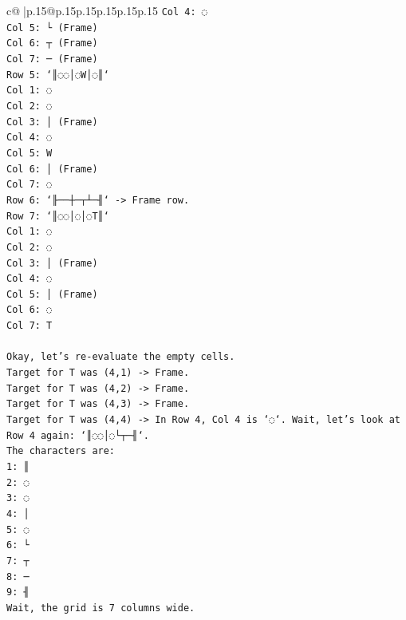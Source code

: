 \documentclass{article}
\begin{document}
{\begin{supertabular}{c@{$\;$}|p{.15\linewidth}@{}p{.15\linewidth}p{.15\linewidth}p{.15\linewidth}p{.15\linewidth}p{.15\linewidth}}
{{{\texttt{Col 4: ◌} \\
\texttt{Col 5: └ (Frame)} \\
\texttt{Col 6: ┬ (Frame)} \\
\texttt{Col 7: ─ (Frame)} \\
\texttt{Row 5: `║◌◌│◌W│◌║`} \\
\texttt{Col 1: ◌} \\
\texttt{Col 2: ◌} \\
\texttt{Col 3: │ (Frame)} \\
\texttt{Col 4: ◌} \\
\texttt{Col 5: W} \\
\texttt{Col 6: │ (Frame)} \\
\texttt{Col 7: ◌} \\
\texttt{Row 6: `╟──┼─┬┴─╢` {-}> Frame row.} \\
\texttt{Row 7: `║◌◌│◌│◌T║`} \\
\texttt{Col 1: ◌} \\
\texttt{Col 2: ◌} \\
\texttt{Col 3: │ (Frame)} \\
\texttt{Col 4: ◌} \\
\texttt{Col 5: │ (Frame)} \\
\texttt{Col 6: ◌} \\
\texttt{Col 7: T} \\
\\ 
\texttt{Okay, let's re{-}evaluate the empty cells.} \\
\texttt{Target for T was (4,1) {-}> Frame.} \\
\texttt{Target for T was (4,2) {-}> Frame.} \\
\texttt{Target for T was (4,3) {-}> Frame.} \\
\texttt{Target for T was (4,4) {-}> In Row 4, Col 4 is `◌`. Wait, let's look at Row 4 again: `║◌◌│◌└┬─╢`.} \\
\texttt{The characters are:} \\
\texttt{1: ║} \\
\texttt{2: ◌} \\
\texttt{3: ◌} \\
\texttt{4: │} \\
\texttt{5: ◌} \\
\texttt{6: └} \\
\texttt{7: ┬} \\
\texttt{8: ─} \\
\texttt{9: ╢} \\
\texttt{Wait, the grid is 7 columns wide.} \\
}}}
\end{supertabular}}
\end{document}
